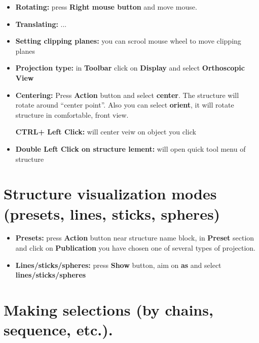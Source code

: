 \documentclass{article}
\begin{document}
\begin{itemize}

    \item \textbf{Rotating:} press \textbf{Right mouse button} and move mouse.

    \item \textbf{Translating:} ...

    \item \textbf{Setting clipping planes:} you can scrool mouse wheel to move clipping planes

    \item \textbf{Projection type:} in \textbf{Toolbar} click on \textbf{Display} and select \textbf{Orthoscopic View}

    \item \textbf{Centering:} Press \textbf{Action} button and select \textbf{center}. The structure will rotate around ``center point''. Also you can select \textbf{orient}, it will rotate structure in comfortable, front view.

\textbf{CTRL+ Left Click:} will center veiw on object you click

    \item \textbf{Double Left Click on structure lement:} will open quick tool menu of structure

\end{itemize}





\section{Structure visualization modes (presets, lines, sticks, spheres)}
\begin{itemize}

    \item \textbf{Presets:} press \textbf{Action} button near structure name block, in \textbf{Preset} section and click on \textbf{Publication} you have chosen one of several types of projection.
    
    \item \textbf{Lines/sticks/spheres:} press \textbf{Show} button, aim on \textbf{as} and select \textbf{lines/sticks/spheres}
    
\end{itemize}





\section{Making selections (by chains, sequence, etc.).}
\end{document}
